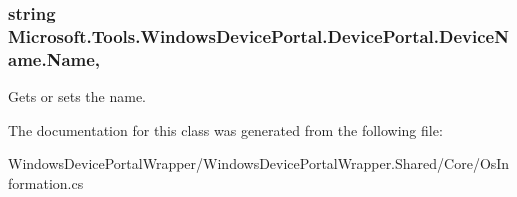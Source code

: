 \subsubsection[{\texorpdfstring{Name}{Name}}]{\setlength{\rightskip}{0pt plus 5cm}string Microsoft.\+Tools.\+Windows\+Device\+Portal.\+Device\+Portal.\+Device\+Name.\+Name\hspace{0.3cm}{\ttfamily [get]}, {\ttfamily [set]}}\hypertarget{class_microsoft_1_1_tools_1_1_windows_device_portal_1_1_device_portal_1_1_device_name_ae0374785073b3621d8d0f0d063aeec37}{}\label{class_microsoft_1_1_tools_1_1_windows_device_portal_1_1_device_portal_1_1_device_name_ae0374785073b3621d8d0f0d063aeec37}


Gets or sets the name. 



The documentation for this class was generated from the following file\+:\begin{DoxyCompactItemize}
\item 
Windows\+Device\+Portal\+Wrapper/\+Windows\+Device\+Portal\+Wrapper.\+Shared/\+Core/Os\+Information.\+cs\end{DoxyCompactItemize}
